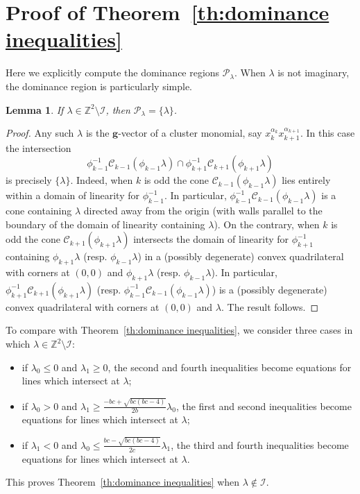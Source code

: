 \documentclass{amsart}
\newtheorem{lemma}[theorem]{Lemma}
\numberwithin{theorem}{section}
\newcommand{\bfg}{\boldsymbol{g}}
\newcommand{\cC}{\mathcal{C}}
\newcommand{\cI}{\mathcal{I}}
\newcommand{\cP}{\mathcal{P}}
\newcommand{\ZZ}{\mathbb{Z}}
\begin{document}
\section{Proof of Theorem~\ref{th:dominance inequalities}}
\label{sec:dominance inequalities}

  Here we explicitly compute the dominance regions $\cP_\lambda$.
  When $\lambda$ is not imaginary, the dominance region is particularly simple.
  \begin{lemma}
    \label{le:cluster monomials}
    If $\lambda\in\ZZ^2\setminus\cI$, then $\cP_\lambda=\{\lambda\}$.
  \end{lemma}
  \begin{proof}
    Any such $\lambda$ is the $\bfg$-vector of a cluster monomial, say $x_k^{\alpha_k}x_{k+1}^{\alpha_{k+1}}$.
    In this case the intersection
    \[\phi_{k-1}^{-1}\cC_{k-1}(\phi_{k-1}\lambda) \cap \phi_{k+1}^{-1}\cC_{k+1}(\phi_{k+1}\lambda)\]
    is precisely $\{\lambda\}$. 
    Indeed, when $k$ is odd the cone $\cC_{k-1}(\phi_{k-1}\lambda)$ lies entirely within a domain of linearity for $\phi_{k-1}^{-1}$.
    In particular, $\phi_{k-1}^{-1}\cC_{k-1}(\phi_{k-1}\lambda)$ is a cone containing $\lambda$ directed away from the origin (with walls parallel to the boundary of the domain of linearity containing $\lambda$).
    On the contrary, when $k$ is odd the cone $\cC_{k+1}(\phi_{k+1}\lambda)$ intersects the domain of linearity for $\phi_{k+1}^{-1}$ containing $\phi_{k+1}\lambda$ (resp. $\phi_{k-1}\lambda$) in a (possibly degenerate) convex quadrilateral with corners at $(0,0)$ and $\phi_{k+1}\lambda$ (resp. $\phi_{k-1}\lambda$).
    In particular, $\phi_{k+1}^{-1}\cC_{k+1}(\phi_{k+1}\lambda)$ (resp. $\phi_{k-1}^{-1}\cC_{k-1}(\phi_{k-1}\lambda)$) is a (possibly degenerate) convex quadrilateral with corners at $(0,0)$ and $\lambda$.
    The result follows.
  \end{proof}
  To compare with Theorem~\ref{th:dominance inequalities}, we consider three cases in which $\lambda\in\ZZ^2\setminus\cI$:
  \begin{itemize}
    \item if $\lambda_0 \le 0$ and $\lambda_1 \ge 0$, the second and fourth inequalities become equations for lines which intersect at $\lambda$;
    \item if $\lambda_0 > 0$ and $\lambda_1 \ge \frac{-bc+\sqrt{bc(bc-4)}}{2b}\lambda_0$, the first and second inequalities become equations for lines which intersect at $\lambda$;
    \item if $\lambda_1 < 0$ and $\lambda_0 \le \frac{bc-\sqrt{bc(bc-4)}}{2c}\lambda_1$, the third and fourth inequalities become equations for lines which intersect at $\lambda$.
  \end{itemize}
  This proves Theorem~\ref{th:dominance inequalities} when $\lambda\notin\cI$.
\end{document}
